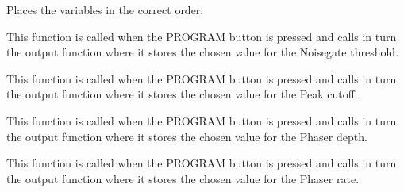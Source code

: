 \documentclass[letterpaper,10pt,english]{sphinxmanual}
\begin{document}

\begin{fulllineitems}
\label{Code:GUI.set_labels}
Places the variables in the correct order.

\end{fulllineitems}


\begin{fulllineitems}
\label{Code:GUI.set_noisegateThreshold}
This function is called when the PROGRAM button is pressed and calls in turn the output function where it stores the chosen 
value for the Noisegate threshold.

\end{fulllineitems}


\begin{fulllineitems}
\label{Code:GUI.set_pc}
This function is called when the PROGRAM button is pressed and calls in turn the output function where it stores the chosen 
value for the Peak cutoff.

\end{fulllineitems}


\begin{fulllineitems}
\label{Code:GUI.set_phaserDepth}
This function is called when the PROGRAM button is pressed and calls in turn the output function where it stores the chosen 
value for the Phaser depth.

\end{fulllineitems}


\begin{fulllineitems}
\label{Code:GUI.set_phaserRate}
This function is called when the PROGRAM button is pressed and calls in turn the output function where it stores the chosen 
value for the Phaser rate.

\end{fulllineitems}
\end{document}
